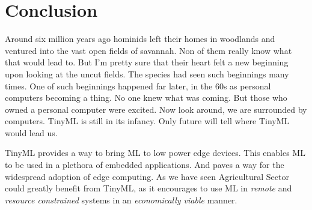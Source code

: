 \documentclass[../main]{subfiles}
\begin{document}
\chapter{Conclusion} \label{chp:}

Around six million years ago hominids left their homes in woodlands and
ventured into the vast open fields of savannah. Non of them really know what
that would lead to. But I'm pretty sure that their heart felt a new beginning
upon looking at the uncut fields. The species had seen such beginnings many
times. One of such beginnings happened far later, in the 60s as personal
computers becoming a thing.  No one knew what was coming. But those who owned a
personal computer were excited. Now look around, we are surrounded by
computers. TinyML is still in its infancy. Only future will tell where TinyML
would lead us.

TinyML provides a way to bring ML to low power edge devices. This enables ML to
be used in a plethora of embedded applications. And paves a way for the
widespread adoption of edge computing. As we have seen Agricultural Sector could
greatly benefit from TinyML, as it encourages to use ML in \emph{remote} and
\emph{resource constrained} systems in an \emph{economically viable} manner.
\end{document}
